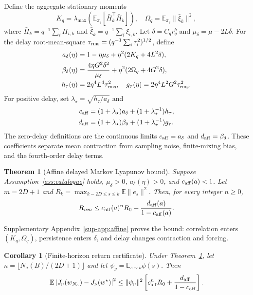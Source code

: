 \documentclass[journal]{IEEEtran}
\newtheorem{theorem}{Theorem}
\newtheorem{corollary}{Corollary}
\newcommand{\E}{\mathbb{E}}
\begin{document}
Define the aggregate stationary moments
\begin{equation}
K_q=\lambda_{\max}\!\left(\E_{\pi_q}[\bar H_k^\top\bar H_k]\right),
\quad
\Omega_q=\E_{\pi_q}\|\bar\xi_k\|^2,
\end{equation}
where $\bar H_k=q^{-1}\sum_iH_{i,k}$ and $\bar\xi_k=q^{-1}\sum_i\xi_{i,k}$.
Let $\delta=C_qr_q^b$ and $\mu_\delta=\mu-2L\delta$.
For the delay root-mean-square $\tau_{\rm rms}=(q^{-1}\sum_i\tau_i^2)^{1/2}$, define
\begin{align}
a_\delta(\eta)&=1-\eta\mu_\delta+\eta^2(2K_q+4L^2\delta),\nonumber\\
\beta_\delta(\eta)&=\frac{4\eta G^2\delta^2}{\mu_\delta}+\eta^2(2\Omega_q+4G^2\delta),\nonumber\\
h_\tau(\eta)&=2\eta^4L^4\tau_{\rm rms}^2,
\quad
g_\tau(\eta)=2\eta^4L^2G^2\tau_{\rm rms}^2.
\label{eq:affine-terms}
\end{align}
For positive delay, set $\lambda_\star=\sqrt{h_\tau/a_\delta}$ and
\begin{align}
c_{\rm aff}&=(1+\lambda_\star)a_\delta+(1+\lambda_\star^{-1})h_\tau,\nonumber\\
d_{\rm aff}&=(1+\lambda_\star)\beta_\delta+(1+\lambda_\star^{-1})g_\tau.
\label{eq:affine-cd}
\end{align}
The zero-delay definitions are the continuous limits $c_{\rm aff}=a_\delta$ and $d_{\rm aff}=\beta_\delta$.
These coefficients separate mean contraction from sampling noise, finite-mixing bias, and the fourth-order delay terms.

\begin{theorem}[Affine delayed Markov Lyapunov bound]
Suppose Assumption~\ref{ass:catalogue} holds, $\mu_\delta>0$, $a_\delta(\eta)>0$, and $c_{\rm aff}(a)<1$.
Let $m=2D+1$ and $R_k=\max_{k-2D\le s\le k}\E\|e_s\|^2$.
Then, for every integer $n\ge0$,
\begin{equation}
R_{nm}\le c_{\rm aff}(a)^nR_0+\frac{d_{\rm aff}(a)}{1-c_{\rm aff}(a)}.
\label{eq:affine-bound}
\end{equation}
\label{thm:affine}
\end{theorem}
Supplementary Appendix~\ref{sup-app:affine} proves the bound: correlation enters $(K_q,\Omega_q)$, persistence enters $\delta$, and delay changes contraction and forcing.

\begin{corollary}[Finite-horizon return certificate]
Under Theorem~\ref{thm:affine}, let $n=\lfloor N_a(B)/(2D+1)\rfloor$ and let $\psi_\nu=\E_{s\sim\nu}\phi(s)$.
Then
\begin{equation}
\E\left|J_\nu(w_{N_a})-J_\nu(w^\star)\right|^2
\le \|\psi_\nu\|^2
\left[c_{\rm aff}^{n}R_0+\frac{d_{\rm aff}}{1-c_{\rm aff}}\right].
\label{eq:return-certificate}
\end{equation}
\label{cor:return}
\end{corollary}
\end{document}
